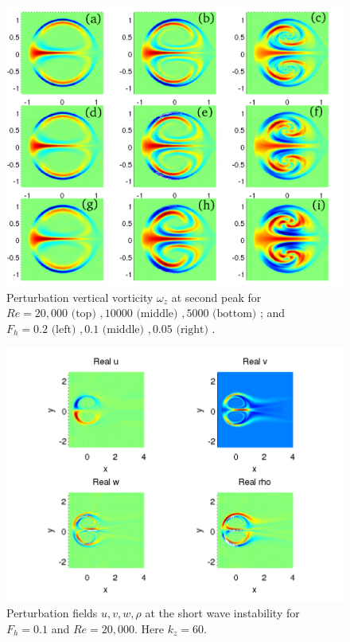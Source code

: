 \begin{figure}
\begin{center}
\includegraphics[width=\textwidth]{vorticity_second_peak}
\caption{Perturbation vertical vorticity $\omega_{z}$ at second peak for $Re=20{,}000\text{ (top) }, 10000 \text{ (middle) }, 5000 \text{ (bottom) }$; and $F_{h}=0.2 \text{ (left) }, 0.1 \text{ (middle) }, 0.05 \text{ (right) }$.}
\label{secondpeak}
\end{center}
\end{figure}
\begin{figure}
\begin{center}
\includegraphics[width=\textwidth]{velocity_fields_kz_60}
\caption{Perturbation fields $u,v,w,\rho$ at the short wave instability for $F_{h}=0.1$ and $Re=20{,}000$. Here $k_{z}=60$.} 
\label{secondpeak_fields}
\end{center}
\end{figure} 
